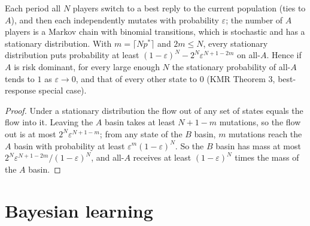 \begin{theorem}
\label{thm:beh-kmr-darwin}
\leanok
Each period all $N$ players switch to a best reply to the current population (ties to $A$), and then each
independently mutates with probability $\varepsilon$; the number of $A$ players is a Markov chain with binomial
transitions, which is stochastic and has a stationary distribution. With $m=\lceil Np^*\rceil$ and $2m\le N$, every
stationary distribution puts probability at least $(1-\varepsilon)^N-2^N\varepsilon^{N+1-2m}$ on all-$A$. Hence if $A$
is risk dominant, for every large enough $N$ the stationary probability of all-$A$ tends to $1$ as $\varepsilon\to0$,
and that of every other state to $0$ (KMR Theorem 3, best-response special case).
\end{theorem}
\begin{proof}
\leanok
Under a stationary distribution the flow out of any set of states equals the flow into it. Leaving the $A$ basin
takes at least $N+1-m$ mutations, so the flow out is at most $2^N\varepsilon^{N+1-m}$; from any state of the $B$
basin, $m$ mutations reach the $A$ basin with probability at least $\varepsilon^m(1-\varepsilon)^N$. So the $B$
basin has mass at most $2^N\varepsilon^{N+1-2m}/(1-\varepsilon)^N$, and all-$A$ receives at least $(1-\varepsilon)^N$
times the mass of the $A$ basin.
\end{proof}

\section{Bayesian learning}

